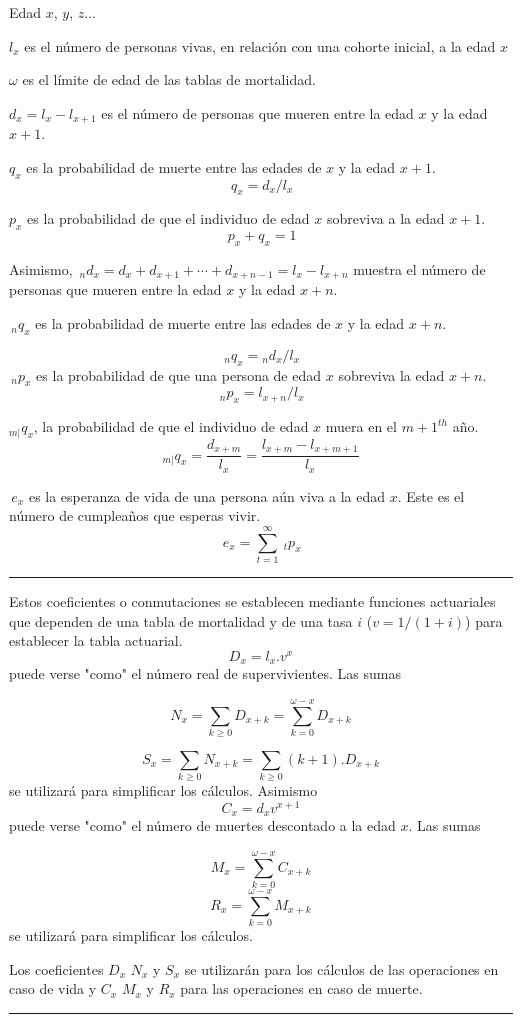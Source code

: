 
\begin{f}

Edad \(x\), \(y\), \(z\)...    

\(l_x\) es el número de personas vivas, en relación con una cohorte inicial, a la edad \(x\)

\(\omega\) es el límite de edad de las tablas de mortalidad.

\(d_x=l_x-l_{x+1}\) es el número de personas que mueren entre la edad \(x\) y la edad \(x+1\).

\(q_x\) es la probabilidad de muerte entre las edades de \(x\) y la edad \(x+1\).
\[
\,q_x = d_x / l_x 
\]

\(p_x\) es la probabilidad de que el individuo de edad \(x\) sobreviva a la edad \(x+1\).
\[
\,p_x+q_x=1 
\]

Asimismo,
\(\,_nd_x = d_x + d_{x+1} + \cdots + d_{x+n-1} = l_x - l_{x+n}\) muestra el número de personas que mueren entre la edad \(x\) y la edad \(x+n\).

\(\,_nq_x\) es la probabilidad de muerte entre las edades de \(x\) y la edad \(x+n\).

\[
\,_nq_x = {}_nd_x / l_x
\]
\(\,_np_x\) es la probabilidad de que una persona de edad \(x\) sobreviva la edad \(x+n\).
\[
\,_np_x = l_{x+n} / l_x 
\]


\({}_{m|}q_{x}\), la probabilidad de que el individuo de edad \(x\) muera en el \({m+1}^{th}\) año.
\[{}_{m|}q_{x}=\frac{d_{x+m}}{l_x}=\frac{l_{x+m}-l_{x+m+1}}{l_x}\]

\(\,e_x\) es la esperanza de vida de una persona aún viva a la edad \(x\).
Este es el número de cumpleaños que esperas vivir.
\[
\,e_x = \sum_{t=1}^{\infty} \ _tp_x 
\]
\end{f}
\hrule

\begin{f}


Estos coeficientes o conmutaciones se establecen mediante funciones actuariales que dependen de una tabla de mortalidad y de una tasa \(i\) (\(v=1/(1+i)\)) para establecer la tabla actuarial.
\[
D_x=l_x .v^x
\]
puede verse "como" el número real de supervivientes. Las sumas

\[
N_x=\sum_{k\geq 0} D_{x+k}=\sum_{k= 0}^{\omega-x} D_{x+k}
\]

\[
S_x=\sum_{k\geq 0} N_{x+k}=\sum_{k\geq 0}(k+1). D_{x+k}
\]
se utilizará para simplificar los cálculos.
Asimismo
\[
C_x = d_x v^{ x+1} 
\]
puede verse "como" el número de muertes descontado a la edad \(x\). Las sumas

\[
M_x=\sum_{k= 0}^{\omega-x} C_{x+k}
\]
\[
R_x=\sum_{k= 0}^{\omega-x} M_{x+k}
\]
se utilizará para simplificar los cálculos.

Los coeficientes \(D_x\) \(N_x\) y \(S_x\) se utilizarán para los cálculos de las operaciones en caso de vida y \(C_x\) \(M_x\) y \(R_x\) para las operaciones en caso de muerte.

\end{f} 
\hrule

